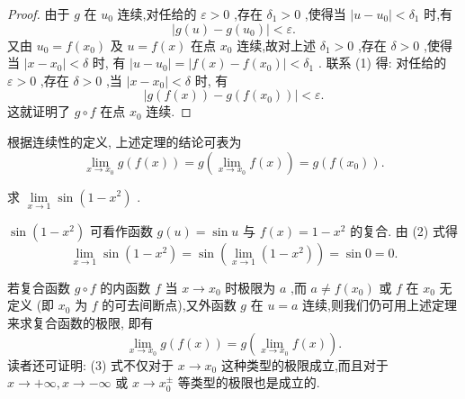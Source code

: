 \begin{proof}
由于 \(g\) 在 \({u}_{0}\) 连续,对任给的 \(\varepsilon  > 0\) ,存在 \({\delta }_{1} > 0\) ,使得当 \(\left| {u - {u}_{0}}\right|  < {\delta }_{1}\) 时,有
\[
\left| {g\left( u\right)  - g\left( {u}_{0}\right) }\right|  < \varepsilon . \tag{1}
\]
又由 \({u}_{0} = f\left( {x}_{0}\right)\) 及 \(u = f\left( x\right)\) 在点 \({x}_{0}\) 连续,故对上述 \({\delta }_{1} > 0\) ,存在 \(\delta  > 0\) ,使得当 \(\left| {x - {x}_{0}}\right|  < \delta\) 时, 有 \(\left| {u - {u}_{0}}\right|  = \left| {f\left( x\right)  - f\left( {x}_{0}\right) }\right|  < {\delta }_{1}\) . 联系 (1) 得: 对任给的 \(\varepsilon  > 0\) ,存在 \(\delta  > 0\) ,当 \(\left| {x - {x}_{0}}\right|  < \delta\) 时, 有
\[
\left| {g\left( {f\left( x\right) }\right)  - g\left( {f\left( {x}_{0}\right) }\right) }\right|  < \varepsilon .
\]
这就证明了 \(g \circ  f\) 在点 \({x}_{0}\) 连续.
\end{proof}


\begin{remark}
根据连续性的定义, 上述定理的结论可表为
\[
\mathop{\lim }\limits_{{x \rightarrow  {x}_{0}}}g\left( {f\left( x\right) }\right)  = g\left( {\mathop{\lim }\limits_{{x \rightarrow  {x}_{0}}}f\left( x\right) }\right)  = g\left( {f\left( {x}_{0}\right) }\right) . \tag{2}
\]
\end{remark}

\begin{example}
求 \(\mathop{\lim }\limits_{{x \rightarrow  1}}\sin \left( {1 - {x}^{2}}\right)\) .
\end{example}


\begin{solution}
\(\sin \left( {1 - {x}^{2}}\right)\) 可看作函数 \(g\left( u\right)  = \sin u\) 与 \(f\left( x\right)  = 1 - {x}^{2}\) 的复合. 由 (2) 式得
\[
\mathop{\lim }\limits_{{x \rightarrow  1}}\sin \left( {1 - {x}^{2}}\right)  = \sin \left( {\mathop{\lim }\limits_{{x \rightarrow  1}}\left( {1 - {x}^{2}}\right) }\right)  = \sin 0 = 0.
\]
\end{solution}

\begin{remark}
若复合函数 \(g \circ  f\) 的内函数 \(f\) 当 \(x \rightarrow  {x}_{0}\) 时极限为 \(a\) ,而 \(a \neq  f\left( {x}_{0}\right)\) 或 \(f\) 在 \({x}_{0}\) 无定义 (即 \({x}_{0}\) 为 \(f\) 的可去间断点),又外函数 \(g\) 在 \(u = a\) 连续,则我们仍可用上述定理来求复合函数的极限, 即有
\[
\mathop{\lim }\limits_{{x \rightarrow  {x}_{0}}}g\left( {f\left( x\right) }\right)  = g\left( {\mathop{\lim }\limits_{{x \rightarrow  {x}_{0}}}f\left( x\right) }\right) . \tag{3}
\]
读者还可证明: (3) 式不仅对于 \(x \rightarrow  {x}_{0}\) 这种类型的极限成立,而且对于 \(x \rightarrow   + \infty ,x \rightarrow   - \infty\) 或 \(x \rightarrow  {x}_{0}^{ \pm  }\) 等类型的极限也是成立的.
\end{remark}


